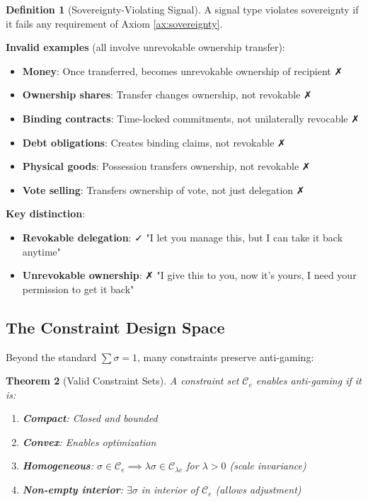 \documentclass[11pt,a4paper]{article}
\newtheorem{theorem}{Theorem}[section]
\theoremstyle{definition}
\newtheorem{definition}[theorem]{Definition}
\theoremstyle{remark}
\newcommand{\C}{\mathcal{C}}
\begin{document}
\begin{definition}[Sovereignty-Violating Signal]
A signal type violates sovereignty if it fails any requirement of Axiom \ref{ax:sovereignty}.

\textbf{Invalid examples} (all involve unrevokable ownership transfer):
\begin{itemize}
\item \textbf{Money}: Once transferred, becomes unrevokable ownership of recipient ✗
\item \textbf{Ownership shares}: Transfer changes ownership, not revokable ✗
\item \textbf{Binding contracts}: Time-locked commitments, not unilaterally revocable ✗
\item \textbf{Debt obligations}: Creates binding claims, not revokable ✗
\item \textbf{Physical goods}: Possession transfers ownership, not revokable ✗
\item \textbf{Vote selling}: Transfers ownership of vote, not just delegation ✗
\end{itemize}

\textbf{Key distinction}:
\begin{itemize}
\item \textbf{Revokable delegation}: ✓ "I let you manage this, but I can take it back anytime"
\item \textbf{Unrevokable ownership}: ✗ "I give this to you, now it's yours, I need your permission to get it back"
\end{itemize}
\end{definition}

\subsection{The Constraint Design Space}

Beyond the standard $\sum \sigma = 1$, many constraints preserve anti-gaming:

\begin{theorem}[Valid Constraint Sets]
\label{thm:valid-constraints}
A constraint set $\C_e$ enables anti-gaming if it is:
\begin{enumerate}
\item \textbf{Compact}: Closed and bounded
\item \textbf{Convex}: Enables optimization
\item \textbf{Homogeneous}: $\sigma \in \C_e \implies \lambda\sigma \in \C_{\lambda e}$ for $\lambda > 0$ (scale invariance)
\item \textbf{Non-empty interior}: $\exists \sigma$ in interior of $\C_e$ (allows adjustment)
\end{enumerate}
\end{theorem}
\end{document}
